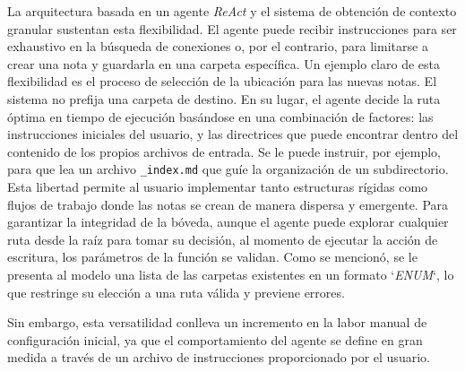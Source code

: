 La arquitectura basada en un agente \textit{ReAct} y el sistema de obtención de contexto granular sustentan esta flexibilidad. El agente puede recibir instrucciones para ser exhaustivo en la búsqueda de conexiones o, por el contrario, para limitarse a crear una nota y guardarla en una carpeta específica. Un ejemplo claro de esta flexibilidad es el proceso de selección de la ubicación para las nuevas notas. El sistema no prefija una carpeta de destino. En su lugar, el agente decide la ruta óptima en tiempo de ejecución basándose en una combinación de factores: las instrucciones iniciales del usuario, y las directrices que puede encontrar dentro del contenido de los propios archivos de entrada. Se le puede instruir, por ejemplo, para que lea un archivo \texttt{\_index.md} que guíe la organización de un subdirectorio. Esta libertad permite al usuario implementar tanto estructuras rígidas como flujos de trabajo donde las notas se crean de manera dispersa y emergente. Para garantizar la integridad de la bóveda, aunque el agente puede explorar cualquier ruta desde la raíz para tomar su decisión, al momento de ejecutar la acción de escritura, los parámetros de la función se validan. Como se mencionó, se le presenta al modelo una lista de las carpetas existentes en un formato `\textit{ENUM}`, lo que restringe su elección a una ruta válida y previene errores.

Sin embargo, esta versatilidad conlleva un incremento en la labor manual de configuración inicial, ya que el comportamiento del agente se define en gran medida a través de un archivo de instrucciones proporcionado por el usuario.

